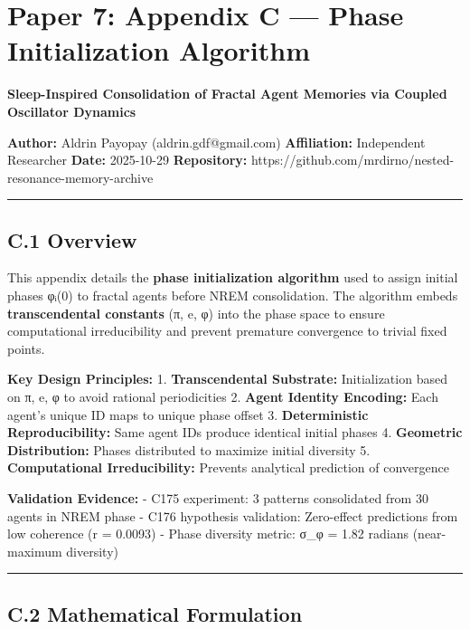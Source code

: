 \documentclass[
]{article}
\author{}
\date{}
\begin{document}
\section{Paper 7: Appendix C --- Phase Initialization
Algorithm}\label{paper-7-appendix-c-phase-initialization-algorithm}

\textbf{Sleep-Inspired Consolidation of Fractal Agent Memories via
Coupled Oscillator Dynamics}

\textbf{Author:} Aldrin Payopay (aldrin.gdf@gmail.com)
\textbf{Affiliation:} Independent Researcher \textbf{Date:} 2025-10-29
\textbf{Repository:}
https://github.com/mrdirno/nested-resonance-memory-archive

\begin{center}\rule{0.5\linewidth}{0.5pt}\end{center}

\subsection{C.1 Overview}\label{c.1-overview}

This appendix details the \textbf{phase initialization algorithm} used
to assign initial phases φᵢ(0) to fractal agents before NREM
consolidation. The algorithm embeds \textbf{transcendental constants}
(π, e, φ) into the phase space to ensure computational irreducibility
and prevent premature convergence to trivial fixed points.

\textbf{Key Design Principles:} 1. \textbf{Transcendental Substrate:}
Initialization based on π, e, φ to avoid rational periodicities 2.
\textbf{Agent Identity Encoding:} Each agent's unique ID maps to unique
phase offset 3. \textbf{Deterministic Reproducibility:} Same agent IDs
produce identical initial phases 4. \textbf{Geometric Distribution:}
Phases distributed to maximize initial diversity 5.
\textbf{Computational Irreducibility:} Prevents analytical prediction of
convergence

\textbf{Validation Evidence:} - C175 experiment: 3 patterns consolidated
from 30 agents in NREM phase - C176 hypothesis validation: Zero-effect
predictions from low coherence (r = 0.0093) - Phase diversity metric:
σ\_φ = 1.82 radians (near-maximum diversity)

\begin{center}\rule{0.5\linewidth}{0.5pt}\end{center}

\subsection{C.2 Mathematical
Formulation}\label{c.2-mathematical-formulation}
\end{document}

